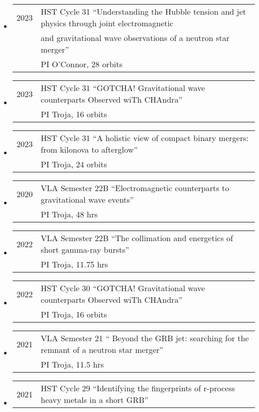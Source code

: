 \begin{itemize}
\item \begin{tabular}{ll}
2023	& HST Cycle 31 ``Understanding the Hubble tension and jet physics through joint electromagnetic\\
&  and gravitational wave observations of a neutron star merger''\\
	&  PI O'Connor, 28 orbits
\end{tabular}
\item \begin{tabular}{ll}
2023	& HST Cycle 31 ``GOTCHA! Gravitational wave counterparts Observed wiTh CHAndra''\\
	&  PI Troja, 16 orbits
\end{tabular}
\item \begin{tabular}{ll}
2023	& HST Cycle 31 ``A holistic view of compact binary mergers: from kilonova to afterglow''\\
	&  PI Troja, 24 orbits
\end{tabular}
\item \begin{tabular}{ll}
2020	& VLA Semester 22B ``Electromagnetic counterparts to gravitational wave events''\\
	&  PI Troja, 48 hrs
\end{tabular}
\item \begin{tabular}{ll}
2022	& VLA Semester 22B ``The collimation and energetics of short gamma-ray bursts''\\
	&  PI Troja, 11.75 hrs
\end{tabular}
\item \begin{tabular}{ll}
2022	& HST Cycle 30 ``GOTCHA! Gravitational wave counterparts Observed wiTh CHAndra''\\
	&  PI Troja, 16 orbits
\end{tabular}
\item \begin{tabular}{ll}
2021	& VLA Semester 21 `` Beyond the GRB jet: searching for the remnant of a neutron star merger''\\
	&  PI Troja, 11.5 hrs
\end{tabular}
\item \begin{tabular}{ll}
2021	& HST Cycle 29 ``Identifying the fingerprints of r-process heavy metals in a short GRB''\\

\end{tabular}
\end{itemize}
